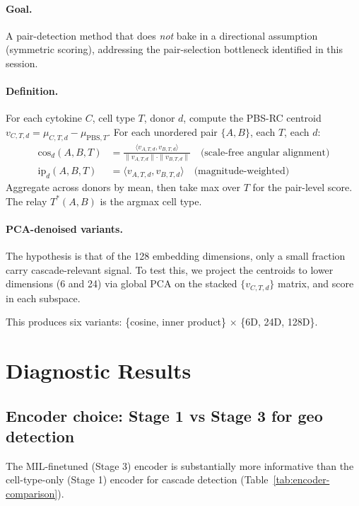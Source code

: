 \documentclass[11pt,a4paper]{article}
\begin{document}
\paragraph{Goal.} A pair-detection method that does \emph{not} bake in a
directional assumption (symmetric scoring), addressing the pair-selection
bottleneck identified in this session.

\paragraph{Definition.} For each cytokine $C$, cell type $T$, donor $d$,
compute the PBS-RC centroid $v_{C,T,d} = \mu_{C,T,d} - \mu_{\mathrm{PBS},T}$.
For each unordered pair $\{A,B\}$, each $T$, each $d$:
\begin{align*}
\mathrm{cos}_d(A,B,T) &= \frac{\langle v_{A,T,d}, v_{B,T,d}\rangle}{\|v_{A,T,d}\|\cdot\|v_{B,T,d}\|}
\quad \text{(scale-free angular alignment)}\\
\mathrm{ip}_d(A,B,T)  &= \langle v_{A,T,d}, v_{B,T,d}\rangle
\quad \text{(magnitude-weighted)}
\end{align*}
Aggregate across donors by mean, then take max over $T$ for the
pair-level score. The relay $T^*(A,B)$ is the argmax cell type.

\paragraph{PCA-denoised variants.} The hypothesis is that of the 128
embedding dimensions, only a small fraction carry cascade-relevant
signal. To test this, we project the centroids to lower dimensions
(6 and 24) via global PCA on the stacked $\{v_{C,T,d}\}$ matrix, and
score in each subspace.

This produces six variants: \{cosine, inner product\} $\times$
\{6D, 24D, 128D\}.

\section{Diagnostic Results}

\subsection{Encoder choice: Stage 1 vs Stage 3 for geo detection}

The MIL-finetuned (Stage 3) encoder is substantially more informative than
the cell-type-only (Stage 1) encoder for cascade detection
(Table~\ref{tab:encoder-comparison}).
\end{document}
